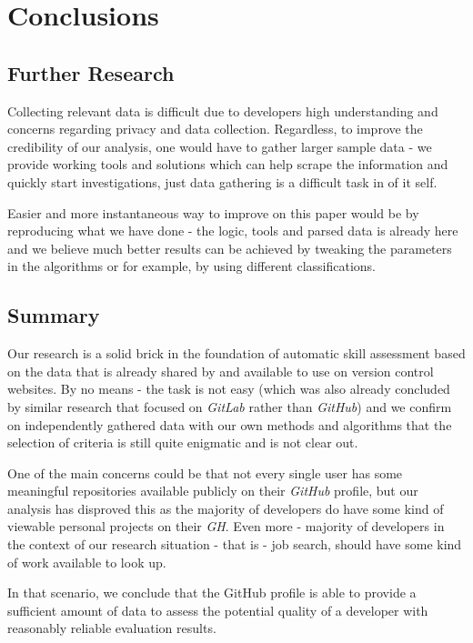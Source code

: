 \section{Conclusions}
\label{sec:conclusions}


\subsection{Further Research}

Collecting relevant data is difficult due to developers high understanding and concerns regarding privacy and data collection. Regardless, to improve the credibility of our analysis, one would have to gather larger sample data - we provide working tools and solutions which can help scrape the information and quickly start investigations, just data gathering is a difficult task in of it self.

Easier and more instantaneous way to improve on this paper would be by reproducing what we have done - the logic, tools and parsed data is already here and we believe much better results can be achieved by tweaking the parameters in the algorithms or for example, by using different classifications.


\subsection{Summary}

Our research is a solid brick in the foundation of automatic skill assessment based on the data that is already shared by  and available to use on version control websites. By no means - the task is not easy (which was also already concluded by similar research that focused on \emph{GitLab} rather than \emph{GitHub}) and we confirm on independently gathered data with our own methods and algorithms that the selection of criteria is still quite enigmatic and is not clear out.  

One of the main concerns could be that not every single user has some meaningful repositories available publicly on their \emph{GitHub} profile, but our analysis has disproved this as the majority of developers do have some kind of viewable personal projects on their \emph{GH}. Even more - majority of developers in the context of our research situation - that is - job search, should have some kind of work available to look up.

In that scenario, we conclude that the GitHub profile is able to provide a sufficient amount of data to assess the potential quality of a developer with reasonably reliable evaluation results.
